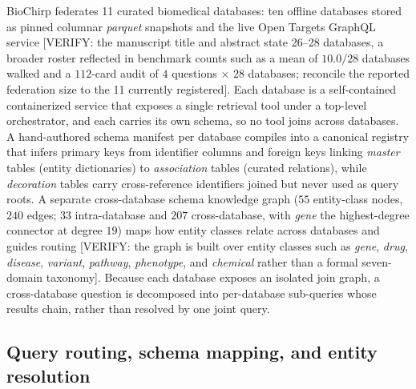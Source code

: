 BioChirp federates 11 curated biomedical databases: ten offline databases stored as pinned columnar \textit{parquet} snapshots and the live Open Targets GraphQL service [VERIFY: the manuscript title and abstract state 26--28 databases, a broader roster reflected in benchmark counts such as a mean of $10.0/28$ databases walked and a $112$-card audit of $4$ questions $\times$ $28$ databases; reconcile the reported federation size to the 11 currently registered]. Each database is a self-contained containerized service that exposes a single retrieval tool under a top-level orchestrator, and each carries its own schema, so no tool joins across databases. A hand-authored schema manifest per database compiles into a canonical registry that infers primary keys from identifier columns and foreign keys linking \textit{master} tables (entity dictionaries) to \textit{association} tables (curated relations), while \textit{decoration} tables carry cross-reference identifiers joined but never used as query roots. A separate cross-database schema knowledge graph ($55$ entity-class nodes, $240$ edges; $33$ intra-database and $207$ cross-database, with \textit{gene} the highest-degree connector at degree $19$) maps how entity classes relate across databases and guides routing [VERIFY: the graph is built over entity classes such as \textit{gene}, \textit{drug}, \textit{disease}, \textit{variant}, \textit{pathway}, \textit{phenotype}, and \textit{chemical} rather than a formal seven-domain taxonomy]. Because each database exposes an isolated join graph, a cross-database question is decomposed into per-database sub-queries whose results chain, rather than resolved by one joint query.

\subsection*{Query routing, schema mapping, and entity resolution}

